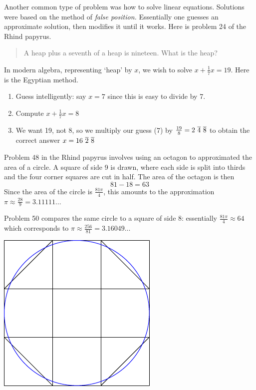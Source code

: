 
Another common type of problem was how to solve linear equations. Solutions were based on the method of \emph{false position.} Essentially one guesses an approximate solution, then modifies it until it works. Here is problem 24 of the Rhind papyrus.
\begin{quote}
A heap plus a seventh of a heap is nineteen. What is the heap?
\end{quote}
In modern algebra, representing `heap' by $x$, we wish to solve $x+\frac 17x=19$. Here is the Egyptian method.
\begin{enumerate}
  \item Guess intelligently: say $x=7$ since this is easy to divide by 7.
  \item Compute $x+\frac 17 x=8$
  \item We want 19, not 8, so we multiply our guess (7) by $\frac{19}8=2\ \overline{4}\ \overline{8}$ to obtain the correct answer $x=16\ \overline{2}\ \overline{8}$
\end{enumerate}


\begin{minipage}[t]{0.67\linewidth}\vspace{0pt}

Problem 48 in the Rhind papyrus involves using an octagon to approximated the area of a circle. A square of side 9 is drawn, where each side is split into thirds and the four corner squares are cut in half. The area of the octagon is then \[81-18=63\]
Since the area of the circle is $\frac{81\pi}4$, this amounts to the approximation $\pi\approx\frac{28}9=3.11111\ldots$\smallbreak

Problem 50 compares the same circle to a square of side 8: essentially $\frac{81\pi}4\approx 64$ which corresponds to $\pi\approx \frac{256}{81}=3.16049\ldots$
\end{minipage}\hfill\begin{minipage}[t]{0.32\linewidth}\vspace{0pt}
\flushright\includegraphics{egypt-octagon}
\end{minipage}\medbreak


